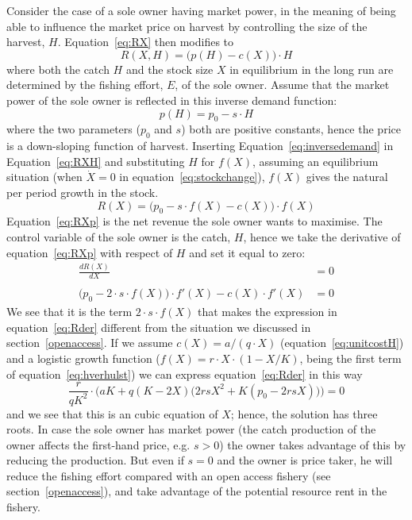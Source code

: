 \documentclass[11pt,fleqn]{book} %
\begin{document}
Consider the case of a sole owner having market power, in the meaning of being able to influence the market price on harvest by controlling the size of the harvest, $H$. Equation~\ref{eq:RX} then modifies to           
\begin{equation} 
\label{eq:RXH}
R(X,H) = \Big( p(H) - c(X) \Big) \cdot H
\end{equation}
where both the catch $H$ and the stock size $X$ in equilibrium in the long run are determined by the fishing effort, $E$, of the sole owner. Assume that the market power of the sole owner is reflected in this inverse demand function:
\begin{equation} 
\label{eq:inversedemand}
p(H) = p_0 - s \cdot H
\end{equation}
where the two parameters ($p_0$ and $s$) both are positive constants, hence the price is a down-sloping function of harvest. Inserting Equation~\ref{eq:inversedemand} in Equation~\ref{eq:RXH} and substituting $H$ for $f(X)$, assuming an equilibrium situation (when $\dot{X} = 0$ in equation~\ref{eq:stockchange}), $f(X)$ gives the natural per period growth in the stock.
\begin{equation} 
\label{eq:RXp}
R(X) = \Big(p_0 - s \cdot f(X) - c(X) \Big) \cdot f(X)
\end{equation}
Equation~\ref{eq:RXp} is the net revenue the sole owner wants to maximise. The control variable of the sole owner is the catch, $H$, hence we take the derivative of equation~\ref{eq:RXp} with respect of $H$ and set it equal to zero:
\begin{equation} 
\label{eq:Rder}
\begin{aligned}
  \frac{d R(X)}{d X} &=  0 \\\\
  \Big(p_0 - 2 \cdot s \cdot f(X)\Big) \cdot f'(X) - c(X) \cdot f'(X) &= 0
\end{aligned}
\end{equation}
We see that it is the term $2 \cdot s \cdot f(X)$ that makes the expression in equation~\ref{eq:Rder} different from the situation we discussed in section~\ref{openaccess}. If we assume $c(X) =a/(q \cdot X)$ (equation~\ref{eq:unitcostH}) and a logistic growth function ($f(X) = r \cdot X \cdot (1 - X/K)$, being the first term of equation~\ref{eq:hverhulst}) we can express equation~\ref{eq:Rder} in this way
\begin{equation} 
\label{eq:Xsole}
\frac{r}{q K^2} \cdot \Bigg(a K + q (K - 2 X) \Big(2 r s X^2 + K (p_0 - 2 r s X) \Big) \Bigg) = 0
\end{equation}
and we see that this is an cubic equation of $X$; hence, the solution has three roots. In case the sole owner has market power (the catch production of the owner affects the first-hand price, e.g. $s > 0$) the owner takes advantage of this by reducing the production. But even if $s = 0$ and the owner is price taker, he will reduce the fishing effort compared with an open access fishery (see section~\ref{openaccess}), and take advantage of the potential resource rent in the fishery. 
\end{document}
